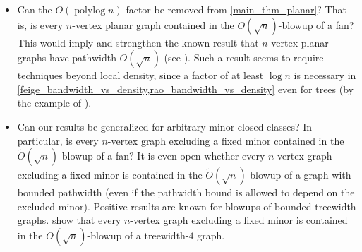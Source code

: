 \documentclass{patmorin}
\newcommand{\david}[1]{{\color{orange} David: #1}}
\newcommand{\pat}[1]{\textcolor{Blue}{Pat: #1}}
\DeclareMathOperator{\polylog}{polylog}
\begin{document}
\begin{itemize}
\item Can the $O(\polylog n)$ factor be removed from \cref{main_thm_planar}? That is, is every $n$-vertex planar graph contained in the $O(\sqrt{n})$-blowup of a fan? This would imply and strengthen the known result that $n$-vertex planar graphs have pathwidth $O(\sqrt{n})$ (see \citep{Bodlaender98}). Such a result seems to require techniques beyond local density, since a factor of at least $\log n$ is necessary in
\cref{feige_bandwidth_vs_density,rao_bandwidth_vs_density}  even for trees (by the example of \citet{chvatalova:on}).




\item Can our results be generalized for arbitrary minor-closed classes? In particular, is every $n$-vertex  graph excluding a fixed minor contained in the $\tilde{O}(\sqrt{n})$-blowup of a fan? It is even open  whether every $n$-vertex graph excluding a fixed minor is contained in the $\tilde{O}(\sqrt{n})$-blowup of a graph with bounded pathwidth (even if the pathwidth bound is allowed to depend on the excluded minor).  Positive results are known for blowups of bounded treewidth graphs. \citet{distel.dujmovic.ea:product} show that every $n$-vertex graph excluding a fixed minor is contained in the $O(\sqrt{n})$-blowup of a treewidth-$4$ graph.
\end{itemize}
\end{document}
